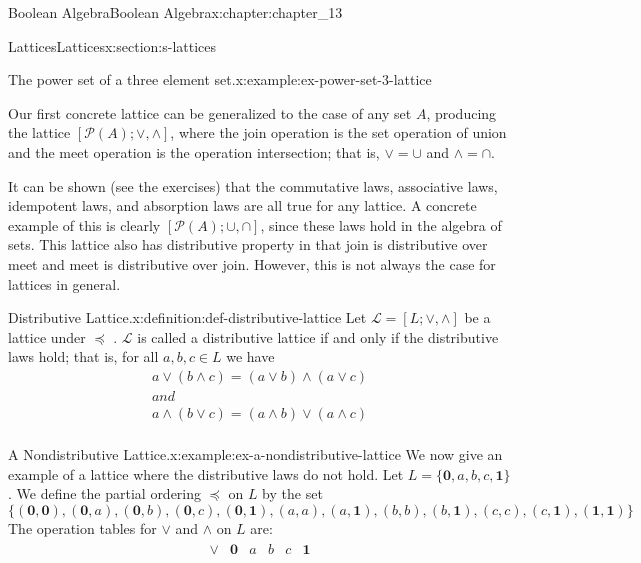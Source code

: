\documentclass[twoside,10pt,]{book}
\numberwithin{equation}{section}
\begin{document}
\begin{chapterptx}{Boolean Algebra}{}{Boolean Algebra}{}{}{x:chapter:chapter_13}
\begin{sectionptx}{Lattices}{}{Lattices}{}{}{x:section:s-lattices}
\begin{example}{The power set of a three element set.}{x:example:ex-power-set-3-lattice}
\end{example}
Our first concrete lattice can be generalized to the case of any set \(A\), producing the lattice \([\mathcal{P}(A); \lor, \land]\), where the join operation is the set operation of union and the meet operation is the operation intersection; that is, \(\lor =\cup\) and \(\land =\cap\).%
\par
It can be shown (see the exercises) that the commutative laws, associative laws, idempotent laws, and absorption laws are all true for any lattice.  A concrete example of this is clearly \([\mathcal{P}(A); \cup, \cap  ]\), since these laws hold in the algebra of sets.  This lattice also has distributive property in that join is distributive over meet and meet is distributive over join. However, this is not always the case for lattices in general.%
\begin{definition}{Distributive Lattice.}{x:definition:def-distributive-lattice}%
%
Let \(\mathcal{L}=[L; \lor, \land ]\) be a lattice under \(\preceq\)	.  \(\mathcal{L}\) is called a distributive lattice if and only if the distributive laws hold; that is, for all \(a, b, c \in  L\) we have%
\begin{equation*}
\begin{array}{c}
a \lor  (b \land  c) = (a \lor  b) \land  (a \lor  c)\\
and \\
a \land  (b \lor  c) = (a \land  b) \lor  (a \land  c)\\
\end{array}
\end{equation*}
%
\end{definition}
\begin{example}{A Nondistributive Lattice.}{x:example:ex-a-nondistributive-lattice}%
We now give an example of a lattice where the distributive laws do not hold. Let \(L = \{\pmb{0},a,b,c,\pmb{1}\}\). We define the partial ordering \(\preceq\) on \(L\) by the set%
\begin{equation*}
\{(\pmb{0},\pmb{0}),(\pmb{0},a),(\pmb{0},b),(\pmb{0},c),(\pmb{0},\pmb{1}),(a,a),(a,\pmb{1}),(b,b),(b,\pmb{1}),(c,c),(c,\pmb{1}),(\pmb{1},\pmb{1})\}
\end{equation*}
The operation tables for \(\lor\) and \(\land\) on \(L\) are:%
\begin{equation*}
\begin{array}{cc}
\begin{array}{c|ccccc}
\lor  & 	 \pmb{0} &  a  & b  &  c &  \pmb{1} \\

\end{array}
\end{array}
\end{equation*}
\end{example}
\end{sectionptx}
\end{chapterptx}
\end{document}
